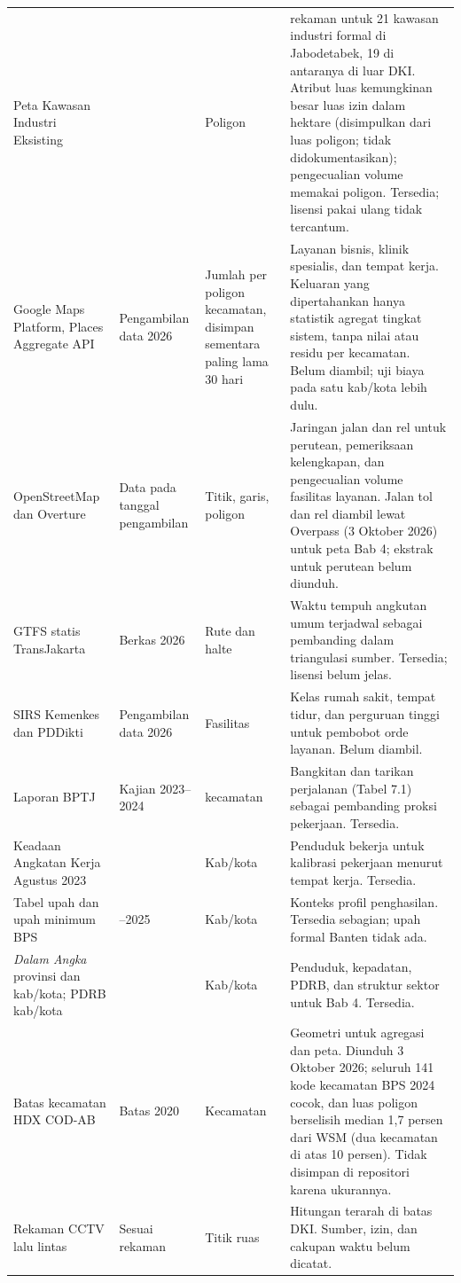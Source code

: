 \documentclass[12pt,a4paper,oneside,openany,indonesian]{report}
\begin{document}
\begin{longtable}{>{\raggedright\arraybackslash}p{} >{\raggedright\arraybackslash}p{} >{\raggedright\arraybackslash}p{} >{\raggedright\arraybackslash}p{}}
Peta Kawasan Industri Eksisting \parencite{kemenperin2025ki} & 2025 & Poligon & 30 rekaman untuk 21 kawasan industri formal di Jabodetabek, 19 di antaranya di luar DKI. Atribut luas kemungkinan besar luas izin dalam hektare (disimpulkan dari luas poligon; tidak didokumentasikan); pengecualian volume memakai poligon. Tersedia; lisensi pakai ulang tidak tercantum. \\
Google Maps Platform, Places Aggregate API & Pengambilan data 2026 & Jumlah per poligon kecamatan, disimpan sementara paling lama 30 hari & Layanan bisnis, klinik spesialis, dan tempat kerja. Keluaran yang dipertahankan hanya statistik agregat tingkat sistem, tanpa nilai atau residu per kecamatan. Belum diambil; uji biaya pada satu kab/kota lebih dulu. \\
OpenStreetMap dan Overture & Data pada tanggal pengambilan & Titik, garis, poligon & Jaringan jalan dan rel untuk perutean, pemeriksaan kelengkapan, dan pengecualian volume fasilitas layanan. Jalan tol dan rel diambil lewat Overpass (3 Oktober 2026) untuk peta Bab 4; ekstrak untuk perutean belum diunduh. \\
GTFS statis TransJakarta \parencite{transjakarta2026gtfs} & Berkas 2026 & Rute dan halte & Waktu tempuh angkutan umum terjadwal sebagai pembanding dalam triangulasi sumber. Tersedia; lisensi belum jelas. \\
SIRS Kemenkes dan PDDikti & Pengambilan data 2026 & Fasilitas & Kelas rumah sakit, tempat tidur, dan perguruan tinggi untuk pembobot orde layanan. Belum diambil. \\
Laporan BPTJ \parencite{bptj2024} & Kajian 2023--2024 & 182 kecamatan & Bangkitan dan tarikan perjalanan (Tabel 7.1) sebagai pembanding proksi pekerjaan. Tersedia. \\
Keadaan Angkatan Kerja Agustus 2023 \parencite{bpskakdki2024,bpskakjabar2024,bpskakbanten2024} & 2023 & Kab/kota & Penduduk bekerja untuk kalibrasi pekerjaan menurut tempat kerja. Tersedia. \\
Tabel upah dan upah minimum BPS & 2019--2025 & Kab/kota & Konteks profil penghasilan. Tersedia sebagian; upah formal Banten tidak ada. \\
\emph{Dalam Angka} provinsi dan kab/kota; PDRB kab/kota \parencite{bpsdki2025,bpsjabar2025,bpsbanten2025,bpspdrb2025} & 2024 & Kab/kota & Penduduk, kepadatan, PDRB, dan struktur sektor untuk Bab 4. Tersedia. \\
Batas kecamatan HDX COD-AB \parencite{hdxcodab2020} & Batas 2020 & Kecamatan & Geometri untuk agregasi dan peta. Diunduh 3 Oktober 2026; seluruh 141 kode kecamatan BPS 2024 cocok, dan luas poligon berselisih median 1,7 persen dari WSM (dua kecamatan di atas 10 persen). Tidak disimpan di repositori karena ukurannya. \\
Rekaman CCTV lalu lintas & Sesuai rekaman & Titik ruas & Hitungan terarah di batas DKI. Sumber, izin, dan cakupan waktu belum dicatat. \\
\end{longtable}
\endgroup
\end{document}
